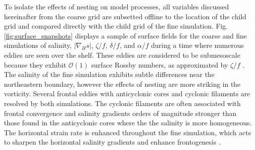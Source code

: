 To isolate the effects of nesting on model processes, all variables discussed hereinafter from the coarse grid are subsetted offline to the location of the child grid and compared directly with the child grid of the fine simulation. Fig. \ref{fig:surface_snapshots} displays a sample of surface fields for the coarse and fine simulations of salinity, $|\nabla_H s|$, $\zeta/f$, $\delta/f$, and $\alpha/f$ during a time where numerous eddies are seen over the shelf. These eddies are considered to be submesoscale because they exhibit $\mathcal{O}(1)$ surface Rossby numbers, as approximated by $\zeta/f$ \citep{Barkan_2017, Kobashi_2020, McWilliams_2016}. The salinity of the fine simulation exhibits subtle differences near the northeastern boundary, however the effects of nesting are more striking in the vorticity. Several frontal eddies with anticyclonic cores and cyclonic filaments are resolved by both simulations. The cyclonic filaments are often associated with frontal convergence \citep{Kobashi_2020, qu2022rapid} and salinity gradients orders of magnitude stronger than those found in the anticyclonic cores where the the salinity is more homogeneous. The horizontal strain rate is enhanced throughout the fine simulation, which acts to sharpen the horizontal salinity gradients and enhance frontogenesis \citep{Hoskins_1972}.

